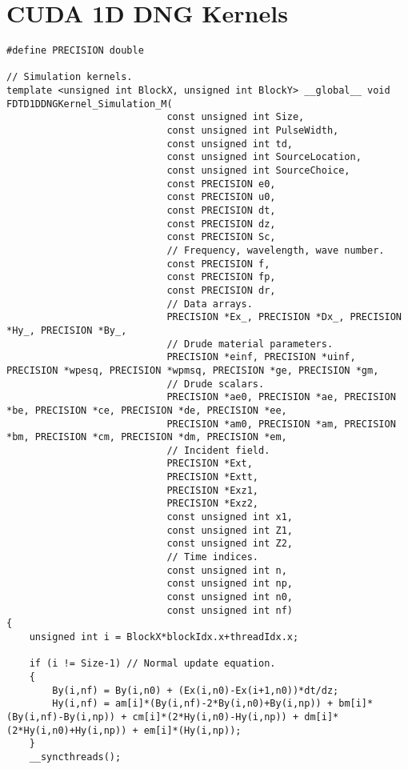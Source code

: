 \section{CUDA 1D DNG Kernels}
\label{App:CUDA-1D-DNG-Kernels}
\begin{lstlisting}
#define PRECISION double

// Simulation kernels.
template <unsigned int BlockX, unsigned int BlockY> __global__ void FDTD1DDNGKernel_Simulation_M(
							const unsigned int Size,
							const unsigned int PulseWidth,
							const unsigned int td,
							const unsigned int SourceLocation,
							const unsigned int SourceChoice,
							const PRECISION e0,
							const PRECISION u0,
							const PRECISION dt,
							const PRECISION dz,
							const PRECISION Sc,
							// Frequency, wavelength, wave number.
							const PRECISION f,
							const PRECISION fp,
							const PRECISION dr,
							// Data arrays.
							PRECISION *Ex_, PRECISION *Dx_, PRECISION *Hy_, PRECISION *By_,
							// Drude material parameters.
							PRECISION *einf, PRECISION *uinf, PRECISION *wpesq, PRECISION *wpmsq, PRECISION *ge, PRECISION *gm,
							// Drude scalars.
							PRECISION *ae0, PRECISION *ae, PRECISION *be, PRECISION *ce, PRECISION *de, PRECISION *ee,
							PRECISION *am0, PRECISION *am, PRECISION *bm, PRECISION *cm, PRECISION *dm, PRECISION *em,
							// Incident field.
							PRECISION *Ext,
							PRECISION *Extt,
							PRECISION *Exz1,
							PRECISION *Exz2,
							const unsigned int x1,
							const unsigned int Z1,
							const unsigned int Z2,
							// Time indices.
							const unsigned int n,
							const unsigned int np,
							const unsigned int n0,
							const unsigned int nf)
{
	unsigned int i = BlockX*blockIdx.x+threadIdx.x;

	if (i != Size-1) // Normal update equation.
	{
		By(i,nf) = By(i,n0) + (Ex(i,n0)-Ex(i+1,n0))*dt/dz;
		Hy(i,nf) = am[i]*(By(i,nf)-2*By(i,n0)+By(i,np)) + bm[i]*(By(i,nf)-By(i,np)) + cm[i]*(2*Hy(i,n0)-Hy(i,np)) + dm[i]*(2*Hy(i,n0)+Hy(i,np)) + em[i]*(Hy(i,np));
	}
	__syncthreads();


\end{lstlisting}
